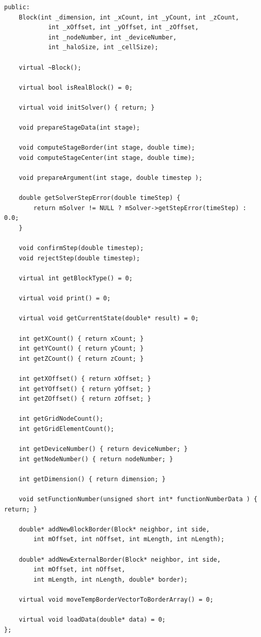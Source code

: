 \documentclass[a4paper, 14pt]{extarticle}
\theoremstyle{definition}
\begin{document}
\begin{lstlisting}
public:
	Block(int _dimension, int _xCount, int _yCount, int _zCount,
			int _xOffset, int _yOffset, int _zOffset,
			int _nodeNumber, int _deviceNumber,
			int _haloSize, int _cellSize);

	virtual ~Block();

	virtual bool isRealBlock() = 0;

	virtual void initSolver() { return; }

	void prepareStageData(int stage);

	void computeStageBorder(int stage, double time);
	void computeStageCenter(int stage, double time);

	void prepareArgument(int stage, double timestep );

	double getSolverStepError(double timeStep) {
		return mSolver != NULL ? mSolver->getStepError(timeStep) : 0.0;
	}

	void confirmStep(double timestep);
	void rejectStep(double timestep);

	virtual int getBlockType() = 0;

	virtual void print() = 0;

	virtual void getCurrentState(double* result) = 0;

	int getXCount() { return xCount; }
	int getYCount() { return yCount; }
	int getZCount() { return zCount; }

	int getXOffset() { return xOffset; }
	int getYOffset() { return yOffset; }
	int getZOffset() { return zOffset; }

	int getGridNodeCount();
	int getGridElementCount();

	int getDeviceNumber() { return deviceNumber; }
	int getNodeNumber() { return nodeNumber; }

	int getDimension() { return dimension; }

	void setFunctionNumber(unsigned short int* functionNumberData ) { return; }

	double* addNewBlockBorder(Block* neighbor, int side,
		int mOffset, int nOffset, int mLength, int nLength);
		
	double* addNewExternalBorder(Block* neighbor, int side,
		int mOffset, int nOffset,
		int mLength, int nLength, double* border);

	virtual void moveTempBorderVectorToBorderArray() = 0;

	virtual void loadData(double* data) = 0;
};
\end{lstlisting}
\end{document}
